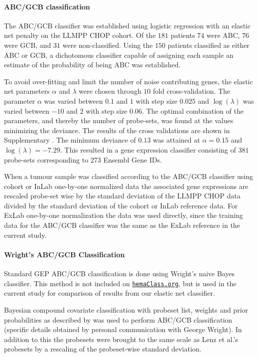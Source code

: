 \documentclass[10pt,letterpaper]{article}
\newcommand{\hemaClass}{\href{http://hemaClass.org}{\texttt{hemaClass.org}}}
\begin{document}
\paragraph{ABC/GCB classification}
The ABC/GCB classifier was established using logistic regression with an elastic net penalty on the LLMPP CHOP cohort.
Of the $181$ patients $74$ were ABC, $76$ were GCB, and $31$ were non-classified.
Using the $150$ patients classified as either ABC or GCB, a dichotomous classifier capable of assigning each sample an estimate of the probability of being ABC was established.

To avoid over-fitting and limit the number of noise contributing genes, the elastic net parameters $\alpha$ and $\lambda$ were chosen through $10$ fold cross-validation.
The parameter $\alpha$ was varied between $0.1$ and $1$ with step size $0.025$ and $\log(\lambda)$ was varied between $-10$ and $2$ with step size $0.06$.
The optimal combination of the parameters, and thereby the number of probe-sets, was found at the values minimizing the deviance.
The results of the cross validations are shown in Supplementary .
The minimum deviance of $0.13$ was attained at $\alpha = 0.15$ and $\log(\lambda) = -7.29$. This resulted in a gene expression classifier consisting of $381$ probe-sets corresponding to 273 Ensembl Gene IDs.

When a tumour sample was classified according to the ABC/GCB classifier using cohort or InLab one-by-one normalized data the associated gene expressions are rescaled probe-set wise by the standard deviation of the LLMPP CHOP data divided by the standard deviation of the cohort or InLab reference data. For ExLab one-by-one normalization the data was used directly, since the training data for the ABC/GCB classifier was the same as the ExLab reference in the current study.

\paragraph{Wright's ABC/GCB Classification}
Standard GEP ABC/GCB classification is done using Wright's naive Bayes classifier. This method is not included on \hemaClass{}, but is used in the current study for comparison of results from our elastic net classifier.

Bayesian compound covariate classification \cite{Wright2003} with probeset list, weights and prior probabilities as described by \cite{Lenz2008a} was used to perform ABC/GCB classification (specific details obtained by personal communication with George Wright). In addition to this the probesets were brought to the same scale as Lenz et al.'s \cite{Lenz2008a} probesets by a rescaling of the probeset-wise standard deviation.
\end{document}
